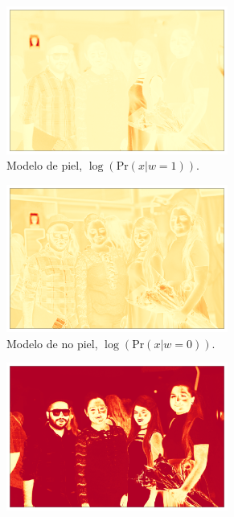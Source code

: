 \newpage
\begin{figure}[ht!]
    \centering
    \begin{subfigure}{0.4\textwidth}
        \centering
        \includegraphics[width=0.8\textwidth]{../figures/image6/image_06_distskin.png}
        \caption{Modelo de piel, $\log(\text{Pr}(x | w=1))$.}
    \end{subfigure}
    \hspace{1cm}
    \begin{subfigure}{0.4\textwidth}
        \centering
        \includegraphics[width=0.8\textwidth]{../figures/image6/image_06_distbg.png}
        \caption{Modelo de no piel, $\log(\text{Pr}(x | w=0))$.}
    \end{subfigure}
    \begin{subfigure}{0.4\textwidth}
        \centering
        \includegraphics[width=0.8\textwidth]{../figures/image6/image_06_postskin.png}

\end{subfigure}
\end{figure}
